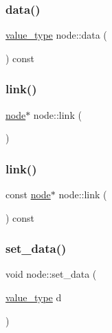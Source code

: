 \subsubsection{\texorpdfstring{data()}{data()}}
{\footnotesize\ttfamily \hyperlink{classnode_af79958a8234d1a3d642adf6637cb9f9b}{value\+\_\+type} node\+::data (\begin{DoxyParamCaption}{ }\end{DoxyParamCaption}) const\hspace{0.3cm}{\ttfamily [inline]}}

\hypertarget{classnode_a3871737751cf0fd295a07c77d0c72f82}{}\label{classnode_a3871737751cf0fd295a07c77d0c72f82} 
\subsubsection{\texorpdfstring{link()}{link()}\hspace{0.1cm}{\footnotesize\ttfamily [1/2]}}
{\footnotesize\ttfamily \hyperlink{classnode}{node}$\ast$ node\+::link (\begin{DoxyParamCaption}{ }\end{DoxyParamCaption})\hspace{0.3cm}{\ttfamily [inline]}}

\hypertarget{classnode_a1cdde999247cd38cf9dc9ee8fc91f5f7}{}\label{classnode_a1cdde999247cd38cf9dc9ee8fc91f5f7} 
\subsubsection{\texorpdfstring{link()}{link()}\hspace{0.1cm}{\footnotesize\ttfamily [2/2]}}
{\footnotesize\ttfamily const \hyperlink{classnode}{node}$\ast$ node\+::link (\begin{DoxyParamCaption}{ }\end{DoxyParamCaption}) const\hspace{0.3cm}{\ttfamily [inline]}}

\hypertarget{classnode_ac9906af97ebcd35ffa46145f865eed6c}{}\label{classnode_ac9906af97ebcd35ffa46145f865eed6c} 
\subsubsection{\texorpdfstring{set\+\_\+data()}{set\_data()}}
{\footnotesize\ttfamily void node\+::set\+\_\+data (\begin{DoxyParamCaption}\item[{\hyperlink{classnode_af79958a8234d1a3d642adf6637cb9f9b}{value\+\_\+type}}]{d }\end{DoxyParamCaption})\hspace{0.3cm}{\ttfamily [inline]}}

